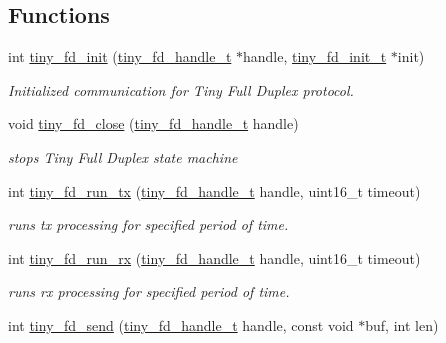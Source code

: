\subsection*{Functions}
\begin{DoxyCompactItemize}
\item 
int \hyperlink{group__FULL__DUPLEX__API_ga27fa59dffd1575419753beb35282bad5}{tiny\+\_\+fd\+\_\+init} (\hyperlink{group__FULL__DUPLEX__API_ga91e6b79431fe38570fb102701ef0b7e8}{tiny\+\_\+fd\+\_\+handle\+\_\+t} $\ast$handle, \hyperlink{group__FULL__DUPLEX__API_gad19ac27f4ba1d2b807e0a440b0c927d2}{tiny\+\_\+fd\+\_\+init\+\_\+t} $\ast$init)
\begin{DoxyCompactList}\small\item\em Initialized communication for Tiny Full Duplex protocol. \end{DoxyCompactList}\item 
void \hyperlink{group__FULL__DUPLEX__API_ga11e470503e3359bc29a5bcb65a9771d5}{tiny\+\_\+fd\+\_\+close} (\hyperlink{group__FULL__DUPLEX__API_ga91e6b79431fe38570fb102701ef0b7e8}{tiny\+\_\+fd\+\_\+handle\+\_\+t} handle)
\begin{DoxyCompactList}\small\item\em stops Tiny Full Duplex state machine \end{DoxyCompactList}\item 
int \hyperlink{group__FULL__DUPLEX__API_ga601c9874a570331580856c1ea28f7914}{tiny\+\_\+fd\+\_\+run\+\_\+tx} (\hyperlink{group__FULL__DUPLEX__API_ga91e6b79431fe38570fb102701ef0b7e8}{tiny\+\_\+fd\+\_\+handle\+\_\+t} handle, uint16\+\_\+t timeout)
\begin{DoxyCompactList}\small\item\em runs tx processing for specified period of time. \end{DoxyCompactList}\item 
int \hyperlink{group__FULL__DUPLEX__API_gad31f944514aef01e27bc3ec67fdbe140}{tiny\+\_\+fd\+\_\+run\+\_\+rx} (\hyperlink{group__FULL__DUPLEX__API_ga91e6b79431fe38570fb102701ef0b7e8}{tiny\+\_\+fd\+\_\+handle\+\_\+t} handle, uint16\+\_\+t timeout)
\begin{DoxyCompactList}\small\item\em runs rx processing for specified period of time. \end{DoxyCompactList}\item 
int \hyperlink{group__FULL__DUPLEX__API_ga490157ee98ea6148f99a5bb1f26c5f60}{tiny\+\_\+fd\+\_\+send} (\hyperlink{group__FULL__DUPLEX__API_ga91e6b79431fe38570fb102701ef0b7e8}{tiny\+\_\+fd\+\_\+handle\+\_\+t} handle, const void $\ast$buf, int len)

\end{DoxyCompactItemize}
